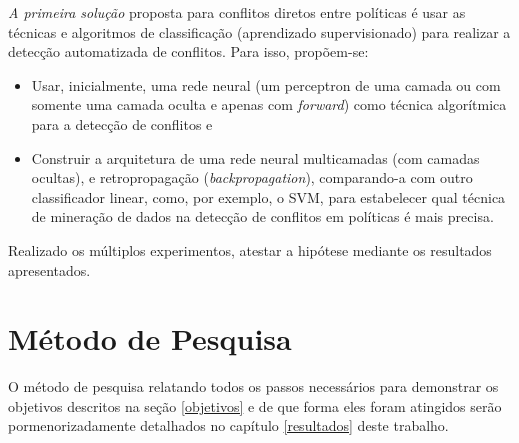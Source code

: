 \documentclass[
	12pt,				%
	openright,			%
	twoside,			%
	a4paper,			%
	english,			%
	french,				%
	spanish,			%
	brazil				%
	]{abntex2}
\begin{document}
\textit{A primeira solução} proposta para conflitos diretos entre políticas é usar as técnicas e algoritmos de classificação (aprendizado supervisionado) para  realizar a detecção automatizada de conflitos. Para isso, propõem-se:
\begin{itemize}
	\item Usar, inicialmente, uma rede neural (um perceptron de uma camada ou com somente uma camada oculta e apenas com \textit{forward}) como técnica algorítmica para a detecção de conflitos e
	\item Construir a arquitetura de uma rede neural multicamadas (com camadas ocultas), e retropropagação (\textit{backpropagation}), comparando-a com outro classificador linear, como, por exemplo, o SVM, para estabelecer qual técnica de mineração de dados na detecção de conflitos em políticas é mais precisa.	
\end{itemize}
Realizado os múltiplos experimentos, atestar a hipótese mediante os resultados apresentados.

\section{Método de Pesquisa} 
O método de pesquisa relatando todos os passos necessários para demonstrar os objetivos descritos na seção \ref{objetivos} e de que forma eles foram atingidos serão pormenorizadamente detalhados no capítulo \ref{resultados} deste trabalho.
\end{document}
